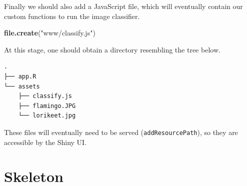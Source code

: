 \documentclass[10pt,]{krantz}
\makeatletter
\newenvironment{Shaded}{\begin{snugshade}}{\end{snugshade}}
\newcommand{\CommentTok}[1]{\textcolor[rgb]{0.37,0.37,0.37}{\textit{#1}}}
\newcommand{\DataTypeTok}[1]{\textcolor[rgb]{0.27,0.27,0.27}{#1}}
\newcommand{\KeywordTok}[1]{\textcolor[rgb]{0.27,0.27,0.27}{\textbf{#1}}}
\newcommand{\NormalTok}[1]{#1}
\newcommand{\StringTok}[1]{\textcolor[rgb]{0.5,0.5,0.5}{#1}}
\newenvironment{kframe}{%
\medskip{}
\setlength{\fboxsep}{.8em}
 \def\at@end@of@kframe{}%
 \ifinner\ifhmode%
  \def\at@end@of@kframe{\end{minipage}}%
  \begin{minipage}{\columnwidth}%
 \fi\fi%
 \def\FrameCommand##1{\hskip\@totalleftmargin \hskip-\fboxsep
 \colorbox{shadecolor}{##1}\hskip-\fboxsep
     \hskip-\linewidth \hskip-\@totalleftmargin \hskip\columnwidth}%
 \MakeFramed {\advance\hsize-\width
   \@totalleftmargin\z@ \linewidth\hsize
   \@setminipage}}%
 {\par\unskip\endMakeFramed%
 \at@end@of@kframe}
\renewenvironment{Shaded}{\begin{kframe}}{\end{kframe}}
\makeatother
\begin{document}
\begin{Shaded}
\end{Shaded}

Finally we should also add a JavaScript file, which will eventually contain our custom functions to run the image classifier.

\begin{Shaded}
\begin{Highlighting}[]
\KeywordTok{file.create}\NormalTok{(}\StringTok{"www/classify.js"}\NormalTok{)}
\end{Highlighting}
\end{Shaded}

At this stage, one should obtain a directory resembling the tree below.

\begin{verbatim}
.
├── app.R
└── assets
    ├── classify.js
    ├── flamingo.JPG
    └── lorikeet.jpg
\end{verbatim}

These files will eventually need to be served (\texttt{addResourcePath}), so they are accessible by the Shiny UI.

\hypertarget{shiny-complete-skeleton}{%
\section{Skeleton}\label{shiny-complete-skeleton}}
\end{document}
